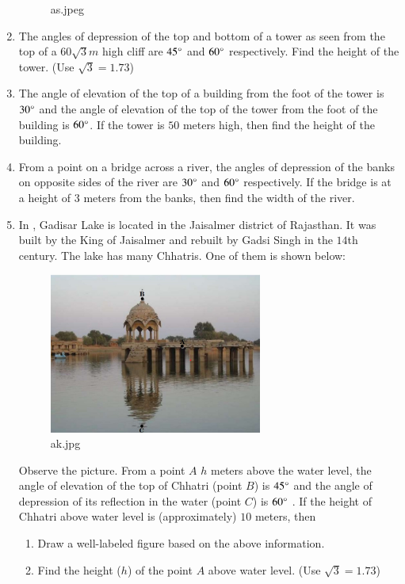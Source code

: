 \begin{enumerate}[label=\thesubsection.\arabic*.,ref=\thesubsection.\theenumi]
\begin{figure}[H]
        \caption{as.jpeg}
        \label{fig:as.jpeg}
    \end{figure}
    \hfill{}
\item The angles of depression of the top and bottom of a tower as seen from the top of a $60\sqrt{3}m$ high cliff are $45\degree$ and $60\degree$ respectively. Find the height of the tower. (Use $\sqrt{3}=1.73$)
    \hfill{}\item The angle of elevation of the top of a building from the foot of the tower is $30\degree$ and the angle of elevation of the top of the tower from the foot of the building is $60\degree$. If the tower is $50$ meters high, then find the height of the building.
    \hfill{}\item From a point on a bridge across a river, the angles of depression of the banks on opposite sides of the river are $30\degree$ and $60\degree$ respectively. If the bridge is at a height of $3$ meters from the banks, then find the width of the river. 
    \hfill{}\item In , Gadisar Lake is located in the Jaisalmer district of Rajasthan. It was built by the King of Jaisalmer and rebuilt by Gadsi Singh in the $14$th century. The lake has many Chhatris. One of them is shown below:
    \begin{figure}[H]
        \centering
    	 \includegraphics[width=70mm]{cbse/figs/ak.jpeg}
        \caption{ak.jpg}
        \label{fig:ak}
    \end{figure}
    Observe the picture. From a point $A$ $h$ meters above the water level, the angle of elevation of the top of Chhatri (point $B$) is $45\degree$ and the angle of depression of its reflection in the water (point $C$) is $60\degree$ . If the height of Chhatri above water level is (approximately) $10$ meters, then 
    \begin{enumerate}
        \item Draw a well-labeled figure based on the above information.
        \item Find the height ($h$) of the point $A$ above water level. (Use $\sqrt{3}=1.73$) 
    \end{enumerate}


\end{enumerate}
